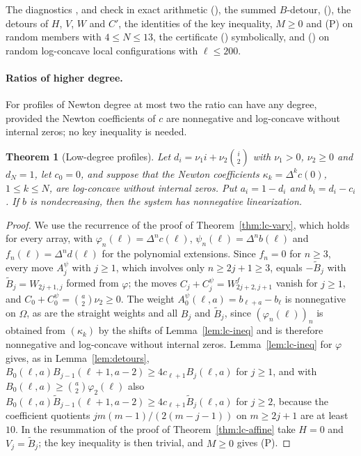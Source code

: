 \documentclass[twoside,10pt]{article}
\numberwithin{equation}{section}
\theoremstyle{slbody}
\newtheorem{theorem}{Theorem}[section]
\theoremstyle{definition}
\theoremstyle{remark}
\renewcommand{\eqref}[1]{\textup{{\normalfont(\oldstylenums{\ref{#1}}}\normalfont)}}
\begin{document}
The diagnostics ,  and  check in exact arithmetic \eqref{eq:quad-B}, the summed $B$-detour, \eqref{eq:quad-key}, the detours of $H$, $V$, $W$ and $C'$, the identities of the key inequality, $M\geq0$ and (P) on random members with $4\leq N\leq13$, the certificate \eqref{eq:quad-cert} symbolically, and \eqref{eq:quad-B} on random log-concave local configurations with $\ell\leq200$.


\paragraph{Ratios of higher degree.}
For profiles of Newton degree at most two the ratio can have any degree, provided the Newton coefficients of $c$ are nonnegative and log-concave without internal zeros; no key inequality is needed.

\begin{theorem}[Low-degree profiles]\label{thm:lc-lowdeg}
Let $d_i=\nu_1i+\nu_2\binom i2$ with $\nu_1>0$, $\nu_2\geq0$ and $d_N=1$, let $c_0=0$, and suppose that the Newton coefficients $\kappa_k=\Delta^kc(0)$, $1\leq k\leq N$, are log-concave without internal zeros. Put $a_i=1-d_i$ and $b_i=d_i-c_i$. If $b$ is nondecreasing, then the system has nonnegative linearization.
\end{theorem}

\begin{proof}
We use the recurrence of the proof of Theorem~\ref{thm:lc-vary}, which holds for every array, with $\varphi_n(\ell)=\Delta^nc(\ell)$, $\psi_n(\ell)=\Delta^nb(\ell)$ and $f_n(\ell)=\Delta^nd(\ell)$ for the polynomial extensions. Since $f_n=0$ for $n\geq3$, every move $A^\psi_j$ with $j\geq1$, which involves only $n\geq2j+1\geq3$, equals $-\widetilde B_j$ with $\widetilde B_j=W_{2j+1,j}$ formed from $\varphi$; the moves $C_j+C^\psi_j=W^f_{2j+2,j+1}$ vanish for $j\geq1$, and $C_0+C^\psi_0=\binom a2\nu_2\geq0$. The weight $A^\psi_0(\ell,a)=b_{\ell+a}-b_\ell$ is nonnegative on $\Omega$, as are the straight weights and all $B_j$ and $\widetilde B_j$, since $(\varphi_n(\ell))_n$ is obtained from $(\kappa_k)$ by the shifts of Lemma~\ref{lem:lc-ineq} and is therefore nonnegative and log-concave without internal zeros. Lemma~\ref{lem:lc-ineq} for $\varphi$ gives, as in Lemma~\ref{lem:detours}, $B_0(\ell,a)B_{j-1}(\ell+1,a-2)\geq4c_{\ell+1}B_j(\ell,a)$ for $j\geq1$, and with $B_0(\ell,a)\geq\binom a2\varphi_2(\ell)$ also $B_0(\ell,a)\widetilde B_{j-1}(\ell+1,a-2)\geq4c_{\ell+1}\widetilde B_j(\ell,a)$ for $j\geq2$, because the coefficient quotients $jm(m-1)/(2(m-j-1))$ on $m\geq2j+1$ are at least $10$. In the resummation of the proof of Theorem~\ref{thm:lc-affine} take $H=0$ and $V_j=\widetilde B_j$; the key inequality is then trivial, and $M\geq0$ gives (P).
\end{proof}
\end{document}

